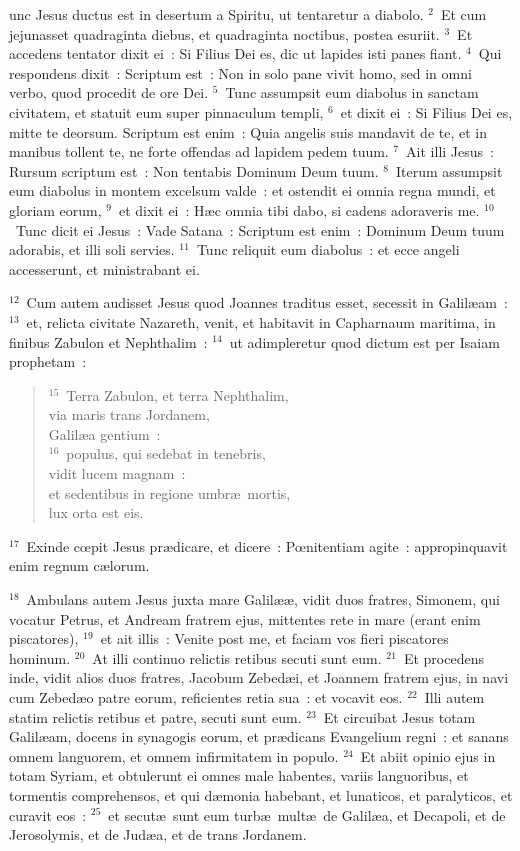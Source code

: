 \bchapter
{}unc Jesus ductus est in desertum a Spiritu, ut tentaretur a diabolo.
${}^{2}$~Et cum jejunasset quadraginta diebus, et quadraginta noctibus, postea esuriit.
${}^{3}$~Et accedens tentator dixit ei~: Si Filius Dei es, dic ut lapides isti panes fiant.
${}^{4}$~Qui respondens dixit~: Scriptum est~: Non in solo pane vivit homo, sed in omni verbo, quod procedit de ore Dei.
${}^{5}$~Tunc assumpsit eum diabolus in sanctam civitatem, et statuit eum super pinnaculum templi,
${}^{6}$~et dixit ei~: Si Filius Dei es, mitte te deorsum. Scriptum est enim~: Quia angelis suis mandavit de te, et in manibus tollent te, ne forte offendas ad lapidem pedem tuum.
${}^{7}$~Ait illi Jesus~: Rursum scriptum est~: Non tentabis Dominum Deum tuum.
${}^{8}$~Iterum assumpsit eum diabolus in montem excelsum valde~: et ostendit ei omnia regna mundi, et gloriam eorum,
${}^{9}$~et dixit ei~: H\ae c omnia tibi dabo, si cadens adoraveris me.
${}^{10}$~Tunc dicit ei Jesus~: Vade Satana~: Scriptum est enim~: Dominum Deum tuum adorabis, et illi soli servies.
${}^{11}$~Tunc reliquit eum diabolus~: et ecce angeli accesserunt, et ministrabant ei.


${}^{12}$~Cum autem audisset Jesus quod Joannes traditus esset, secessit in Galil\ae am~:
${}^{13}$~et, relicta civitate Nazareth, venit, et habitavit in Capharnaum maritima, in finibus Zabulon et Nephthalim~:
${}^{14}$~ut adimpleretur quod dictum est per Isaiam prophetam~:
\begin{verse}${}^{15}$~Terra Zabulon, et terra Nephthalim,\\ via maris trans Jordanem,\\ Galil\ae a gentium~:\\
${}^{16}$~populus, qui sedebat in tenebris,\\ vidit lucem magnam~:\\ et sedentibus in regione umbr\ae\ mortis,\\ lux orta est eis.\end{verse}


${}^{17}$~Exinde cœpit Jesus pr\ae dicare, et dicere~: Pœnitentiam agite~: appropinquavit enim regnum c\ae lorum.


${}^{18}$~Ambulans autem Jesus juxta mare Galil\ae \ae , vidit duos fratres, Simonem, qui vocatur Petrus, et Andream fratrem ejus, mittentes rete in mare (erant enim piscatores),
${}^{19}$~et ait illis~: Venite post me, et faciam vos fieri piscatores hominum.
${}^{20}$~At illi continuo relictis retibus secuti sunt eum.
${}^{21}$~Et procedens inde, vidit alios duos fratres, Jacobum Zebed\ae i, et Joannem fratrem ejus, in navi cum Zebed\ae o patre eorum, reficientes retia sua~: et vocavit eos.
${}^{22}$~Illi autem statim relictis retibus et patre, secuti sunt eum.
${}^{23}$~Et circuibat Jesus totam Galil\ae am, docens in synagogis eorum, et pr\ae dicans Evangelium regni~: et sanans omnem languorem, et omnem infirmitatem in populo.
${}^{24}$~Et abiit opinio ejus in totam Syriam, et obtulerunt ei omnes male habentes, variis languoribus, et tormentis comprehensos, et qui d\ae monia habebant, et lunaticos, et paralyticos, et curavit eos~:
${}^{25}$~et secut\ae\ sunt eum turb\ae\ mult\ae\ de Galil\ae a, et Decapoli, et de Jerosolymis, et de Jud\ae a, et de trans Jordanem.

